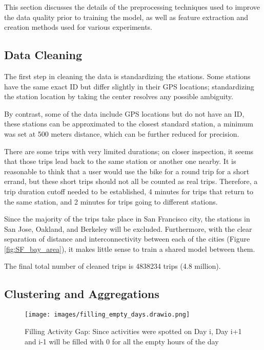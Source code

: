 \documentclass{article}
\begin{document}
This section discusses the details of the preprocessing techniques used to improve the data quality prior to training the model, as well as feature extraction and creation methods used for various experiments.

\subsection{Data Cleaning}

The first step in cleaning the data is standardizing the stations. Some stations have the same exact ID but differ slightly in their GPS locations; standardizing the station location by taking the center resolves any possible ambiguity.

By contrast, some of the data include GPS locations but do not have an ID, these stations can be approximated to the closest standard station, a minimum was set at 500 meters distance, which can be further reduced for precision.

There are some trips with very limited durations; on closer inspection, it seems that those trips lead back to the same station or another one nearby. It is reasonable to think that a user would use the bike for a round trip for a short errand, but these short trips should not all be counted as real trips. Therefore, a trip duration cutoff needed to be established, 4 minutes for trips that return to the same station, and 2 minutes for trips going to different stations.

Since the majority of the trips take place in San Francisco city, the stations in San Jose, Oakland, and Berkeley will be excluded. Furthermore, with the clear separation of distance and interconnectivity between each of the cities (Figure \ref{fig:SF_bay_area}), it makes little sense to train a shared model between them.

The final total number of cleaned trips is 4838234 trips (4.8 million).

\subsection{Clustering and Aggregations}

\begin{center}
\begin{figure}
\hspace*{-2cm}  
\centering
\texttt{[image: images/filling\_empty\_days.drawio.png]}
\caption{Filling Activity Gap: Since activities were spotted on Day i, Day i+1 and i-1 will be filled with 0 for all the empty hours of the day}
\label{fig:fill_gap}
\end{figure}
\end{center}
\end{document}
